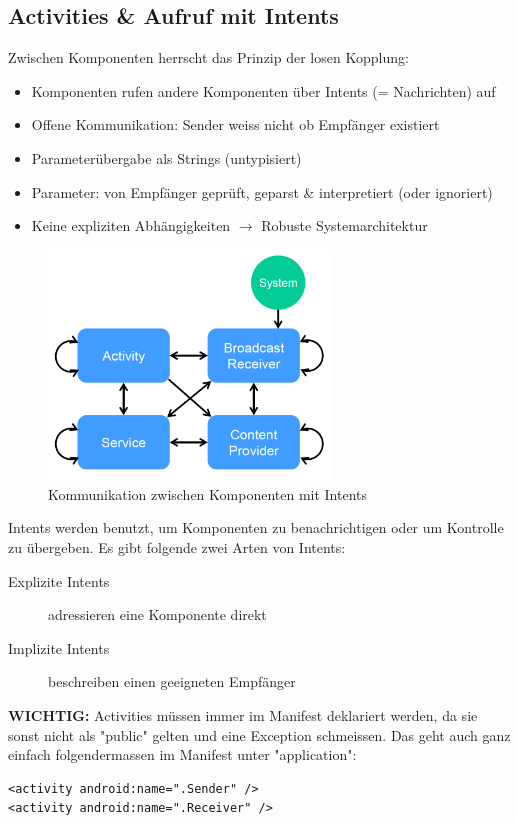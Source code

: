\documentclass[a4paper]{article}
\begin{document}
\subsection{Activities \& Aufruf mit Intents}
Zwischen Komponenten herrscht das Prinzip der losen Kopplung:
\begin{itemize}
	\item Komponenten rufen andere Komponenten über Intents (= Nachrichten) auf
	\item Offene Kommunikation: Sender weiss nicht ob Empfänger existiert
	\item Parameterübergabe als Strings (untypisiert)
	\item Parameter: von Empfänger geprüft, geparst \& interpretiert (oder ignoriert)
	\item Keine expliziten Abhängigkeiten $\rightarrow$ Robuste Systemarchitektur
\end{itemize}
\newpage
\begin{figure}[htb!]
	\centering
	\includegraphics[width=7.5cm]{img/intents_comm.png}
	\caption{Kommunikation zwischen Komponenten mit Intents}
	\label{fig:intents_comm}	
\end{figure}
\noindent
Intents werden benutzt, um Komponenten zu benachrichtigen oder um Kontrolle zu übergeben. Es gibt folgende zwei Arten von Intents:
\begin{description}
	\item[Explizite Intents] adressieren eine Komponente direkt
	\item[Implizite Intents] beschreiben einen geeigneten Empfänger
\end{description}
\textbf{WICHTIG:} Activities müssen immer im Manifest deklariert werden, da sie sonst nicht als "public" gelten und eine Exception schmeissen. Das geht auch ganz einfach folgendermassen im Manifest unter "application":
\begin{lstlisting}
<activity android:name=".Sender" />
<activity android:name=".Receiver" />
\end{lstlisting}
\end{document}
